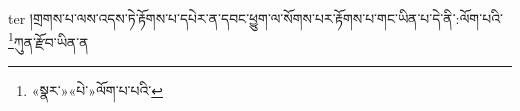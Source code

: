 ter{ }།གྲགས་པ་ལས་འདས་ཏེ་རྟོགས་པ་དཔེར་ན་དབང་ཕྱུག་ལ་སོགས་པར་རྟོགས་པ་གང་ཡིན་པ་དེ་ནི་:ལོག་པའི་\footnote{«སྣར་»«པེ་»ལོག་པ་པའི་}ཀུན་རྫོབ་ཡིན་ན